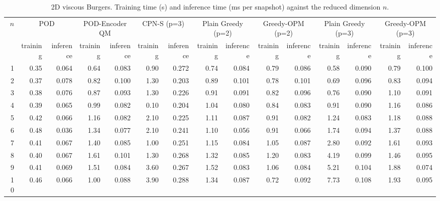 \begin{table}[tb]
  \centering
  \caption{2D viscous Burgers. Training time (s) and inference time (ms per snapshot) against the reduced dimension \( n \).}
  \label{tab:burgers2d_timings}
  \small
  \setlength{\tabcolsep}{4pt}
  \begin{tabular}{rrrrrrrrrrrrrrr}
    \toprule
    \multirow{2}{*}{\( n \)} & \multicolumn{2}{c}{POD} & \multicolumn{2}{c}{POD-Encoder QM} & \multicolumn{2}{c}{CPN-S (p=3)} & \multicolumn{2}{c}{Plain Greedy (p=2)} & \multicolumn{2}{c}{Greedy-OPM (p=2)} & \multicolumn{2}{c}{Plain Greedy (p=3)} & \multicolumn{2}{c}{Greedy-OPM (p=3)} \\
    \cmidrule(lr){2-3} \cmidrule(lr){4-5} \cmidrule(lr){6-7} \cmidrule(lr){8-9} \cmidrule(lr){10-11} \cmidrule(lr){12-13} \cmidrule(lr){14-15}
     & training & inference & training & inference & training & inference & training & inference & training & inference & training & inference & training & inference \\
    \midrule
    1 & 0.35 & 0.064 & 0.64 & 0.083 & 0.90 & 0.272 & 0.74 & 0.084 & 0.79 & 0.086 & 0.58 & 0.090 & 0.79 & 0.100 \\
    2 & 0.37 & 0.078 & 0.82 & 0.100 & 1.30 & 0.203 & 0.89 & 0.101 & 0.78 & 0.101 & 0.69 & 0.096 & 0.83 & 0.094 \\
    3 & 0.38 & 0.076 & 0.87 & 0.093 & 1.30 & 0.226 & 0.91 & 0.091 & 0.82 & 0.096 & 0.76 & 0.090 & 1.10 & 0.091 \\
    4 & 0.39 & 0.065 & 0.99 & 0.082 & 0.10 & 0.204 & 1.04 & 0.080 & 0.84 & 0.083 & 0.91 & 0.090 & 1.16 & 0.086 \\
    5 & 0.42 & 0.066 & 1.16 & 0.082 & 2.10 & 0.225 & 1.11 & 0.087 & 0.91 & 0.082 & 1.24 & 0.083 & 1.18 & 0.088 \\
    6 & 0.48 & 0.036 & 1.34 & 0.077 & 2.10 & 0.241 & 1.10 & 0.056 & 0.91 & 0.066 & 1.74 & 0.094 & 1.37 & 0.088 \\
    7 & 0.41 & 0.067 & 1.40 & 0.085 & 1.00 & 0.251 & 1.15 & 0.084 & 1.05 & 0.087 & 2.80 & 0.092 & 1.61 & 0.093 \\
    8 & 0.40 & 0.067 & 1.61 & 0.101 & 1.30 & 0.268 & 1.32 & 0.085 & 1.20 & 0.083 & 4.19 & 0.099 & 1.46 & 0.095 \\
    9 & 0.41 & 0.069 & 1.51 & 0.084 & 3.60 & 0.267 & 1.52 & 0.083 & 1.06 & 0.084 & 5.21 & 0.104 & 1.88 & 0.074 \\
    10 & 0.46 & 0.066 & 1.00 & 0.088 & 3.90 & 0.288 & 1.34 & 0.087 & 0.72 & 0.092 & 7.73 & 0.108 & 1.93 & 0.095 \\
    \bottomrule
  \end{tabular}
\end{table}
